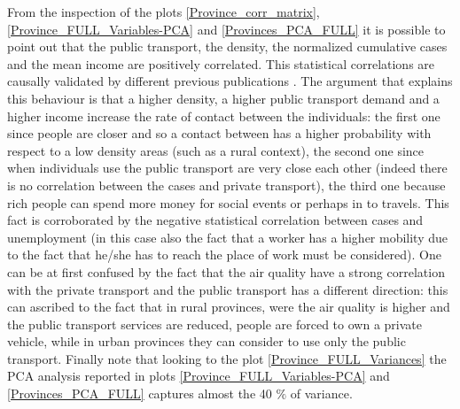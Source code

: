 \documentclass[
12pt, %
a4paper, %
oneside, %
headinclude,footinclude, %
BCOR5mm, %
]{scrartcl}
\begin{document}
From the inspection of the plots \ref{Province_corr_matrix},\ref{Province_FULL_Variables-PCA} and \ref{Provinces_PCA_FULL} it is possible to point out that the public transport, the density, the normalized cumulative cases and the mean income are positively correlated. This statistical correlations are causally validated by different previous publications \cite{neiderud2015urbanization,world2010hidden,gangemi2020rich,weyers2008low}. The argument that explains this behaviour is that a higher density, a higher public transport demand and a higher income increase the rate of contact between the individuals: the first one since people are closer and so a contact between has a higher probability with respect to a low density areas (such as a rural context), the second one since when individuals use the public transport are very close each other (indeed there is no correlation between the cases and private transport), the third one because rich people can spend more money for social events or perhaps in to travels. This fact is corroborated by the negative statistical correlation between cases and unemployment (in this case also the fact that a worker has a higher mobility due to the fact that he/she has to reach the place of work must be considered). One can be at first confused by the fact that the air quality have a strong correlation with the private transport and the public transport has a different direction: this can ascribed to the fact that in rural provinces, were the air quality is higher and the public transport services are reduced,  people are forced to own a private vehicle, while in urban provinces they can consider to use only the public transport. Finally note that looking to the plot \ref{Province_FULL_Variances} the PCA analysis reported in plots \ref{Province_FULL_Variables-PCA} and \ref{Provinces_PCA_FULL} captures almost the 40 $\%$ of variance. 
\end{document}
